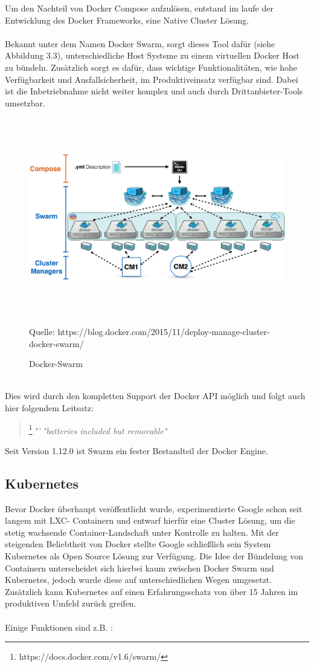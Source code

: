 \documentclass[12pt,toc=bib,toc=listof]{scrreprt}
\begin{document}
Um den Nachteil von Docker Compose aufzulösen, entstand im laufe der Entwicklung des Docker Frameworks, eine Native Cluster Lösung.\\
\\
Bekannt unter dem Namen Docker Swarm, sorgt dieses Tool dafür (siehe Abbildung 3.3), unterschiedliche Host Systeme zu einem virtuellen Docker Host zu bündeln.
Zusätzlich sorgt es dafür, dass wichtige Funktionalitäten, wie hohe Verfügbarkeit und Ausfallsicherheit, im Produktiveinsatz verfügbar sind.
Dabei ist die Inbetriebnahme nicht weiter komplex und auch durch Drittanbieter-Tools umsetzbar.\\
\begin{figure}
	\centering
	\caption{Docker-Swarm}
	\includegraphics[width=15cm, height=9cm, scale=0.3]{docker-swarm.png}
	Quelle: https://blog.docker.com/2015/11/deploy-manage-cluster-docker-swarm/
\end{figure}
\\
Dies wird durch den kompletten Support der Docker API möglich und folgt auch hier folgendem Leitsatz:

\begin{quote}
	\footnote[1]{https://docs.docker.com/v1.6/swarm/}
	"`\textit{"batteries included but removable"}
\end{quote}
Seit Version 1.12.0 ist Swarm ein fester Bestandteil der Docker Engine.\cite{swarm}
\subsection{Kubernetes}
Bevor Docker überhaupt veröffentlicht wurde, experimentierte Google schon seit langem mit LXC- Containern und entwarf hierfür eine Cluster Lösung, um die stetig wachsende Container-Landschaft unter Kontrolle zu halten.
Mit der steigenden Beliebtheit von Docker stellte Google schließlich sein System Kubernetes als Open Source Lösung zur Verfügung.
Die Idee der Bündelung von Containern unterscheidet sich hierbei kaum zwischen Docker Swarm und Kubernetes, jedoch wurde diese auf unterschiedlichen Wegen umgesetzt.
Zusätzlich kann Kubernetes auf einen Erfahrungsschatz von über 15 Jahren im produktiven Umfeld zurück greifen.\\
\\
Einige Funktionen sind z.B. :
\end{document}
